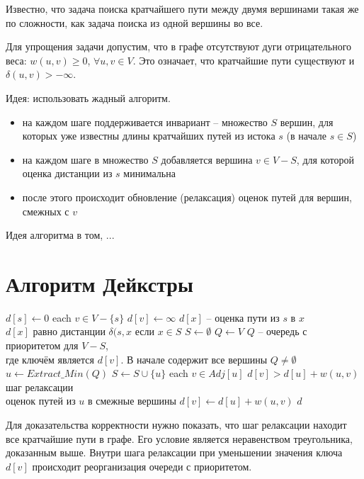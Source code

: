 \documentclass[11pt]{article}
\begin{document}
Известно, что задача поиска кратчайшего пути между двумя вершинами такая же по сложности, как задача поиска из одной вершины во все.

Для упрощения задачи допустим, что в графе отсутствуют дуги отрицательного веса: $w(u, v) \geqslant 0$, $\forall u, v \in V$. Это означает, что кратчайшие пути существуют и $\delta(u, v) > - \infty$.

Идея: использовать жадный алгоритм.
\begin{itemize}
\item на каждом шаге поддерживается инвариант -- множество $S$ вершин, для которых уже известны длины кратчайших путей из истока $s$ (в начале $s \in S$)
\item на каждом шаге в множество $S$ добавляется вершина $v \in V-S$, для которой оценка дистанции из $s$ минимальна
\item после этого происходит обновление (релаксация) оценок путей для вершин, смежных с $v$
\end{itemize}
Идея алгоритма в том, ...

\section{Алгоритм Дейкстры}
\begin{codebox}
\li $d[s] \gets 0$
\li \For each $v \in V - \{s\}$
\li     \Do $d[v] \gets \infty$ \Comment $d[x]$ -- оценка пути из $s$ в $x$ \\
\Comment $d[x]$ равно дистанции $\delta(s, x$ если $x \in S$
    \End
\li $S \gets \emptyset$
\li $Q \gets V$ \Comment $Q$ -- очередь с приоритетом для $V-S$, \\
\Comment где ключём является $d[v]$. В начале содержит все вершины
\li \While $Q \neq \emptyset$
\li     \Do $u \gets Extract\_Min(Q)$
\li         $S \gets S \cup \{u\}$
\li         \For each $v \in Adj[u]$
\li             \Do \If $d[v] > d[u] + w(u, v)$ \Comment шаг релаксации \\
\Comment оценок путей из $u$ в смежные вершины
\li                 \Then $d[v] \gets d[u] + w(u, v)$
                    \End
            \End
    \End
\li \Return $d$
\end{codebox}
Для доказательства корректности нужно показать, что шаг релаксации находит все кратчайшие пути в графе. Его условие является неравенством треугольника, доказанным выше. Внутри шага релаксации при уменьшении значения ключа $d[v]$ происходит реорганизация очереди с приоритетом.
\end{document}
